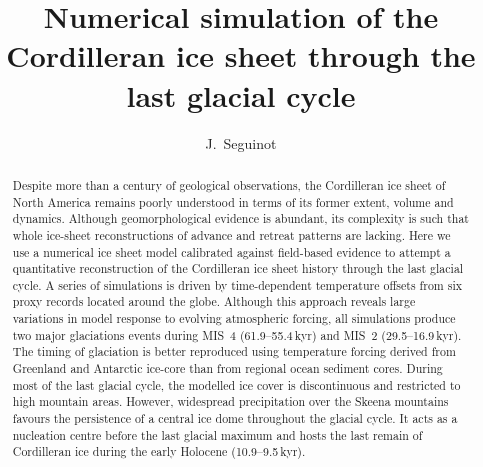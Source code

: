 \documentclass[tc, ms]{copernicus}
\begin{document}
\hack{\sloppy}

\title{Numerical simulation of the Cordilleran ice sheet
       through the last glacial cycle}

\author[1,2]{J.~Seguinot}



\received{}
\accepted{}
\published{}

\maketitle

\begin{abstract}

  Despite more than a century of geological observations, the Cordilleran ice
  sheet of North America remains poorly understood in terms of its former
  extent, volume and dynamics. Although geomorphological evidence is abundant,
  its complexity is such that whole ice-sheet reconstructions of advance and
  retreat patterns are lacking. Here we use a numerical ice sheet model
  calibrated against field-based evidence to attempt a quantitative
  reconstruction of the Cordilleran ice sheet history through the last glacial
  cycle. A series of simulations is driven by time-dependent temperature
  offsets from six proxy records located around the globe. Although this
  approach reveals large variations in model response to evolving atmospheric
  forcing, all simulations produce two major glaciations events during MIS~4
  (61.9--55.4\,\unit{kyr}) and MIS~2 (29.5--16.9\,\unit{kyr}). The timing of
  glaciation is
  better reproduced using temperature forcing derived from Greenland and
  Antarctic ice-core than from regional ocean sediment cores. During most of
  the last glacial cycle, the modelled ice cover is discontinuous and
  restricted to high mountain areas. However, widespread precipitation over the
  Skeena mountains favours the persistence of a central ice dome throughout the
  glacial cycle. It acts as a nucleation centre before the last glacial maximum
  and hosts the last remain of Cordilleran ice during the
  early Holocene (10.9--9.5\,\unit{kyr}).

\end{abstract}
\end{document}
